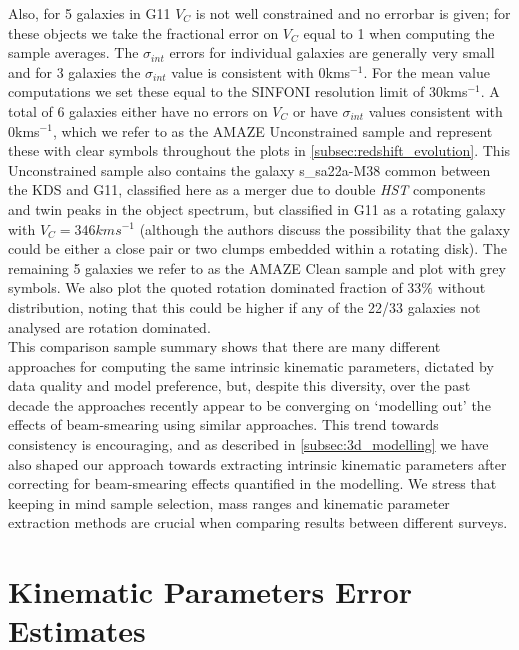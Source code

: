 \documentclass[fleqn,usenatbib]{mn2e}
\begin{document}
Also, for 5 galaxies in G11 $V_{C}$ is not well constrained and no errorbar is given; for these objects we take the fractional error on $V_{C}$ equal to 1 when computing the sample averages.
The $\sigma_{int}$ errors for individual galaxies are generally very small and for 3 galaxies the $\sigma_{int}$ value is consistent with 0kms$^{-1}$.
For the mean value computations we set these equal to the SINFONI resolution limit of 30kms$^{-1}$.
A total of 6 galaxies either have no errors on $V_{C}$ or have $\sigma_{int}$ values consistent with 0kms$^{-1}$, which we refer to as the AMAZE Unconstrained sample and represent these with clear symbols throughout the plots in \cref{subsec:redshift_evolution}.
This Unconstrained sample also contains the galaxy s\_sa22a-M38 common between the KDS and G11, classified here as a merger due to double {\em HST} components and twin peaks in the object spectrum, but classified in G11 as a rotating galaxy with $V_{C} = 346kms^{-1}$ (although the authors discuss the possibility that the galaxy could be either a close pair or two clumps embedded within a rotating disk).
The remaining 5 galaxies we refer to as the AMAZE Clean sample and plot with grey symbols.
We also plot the quoted rotation dominated fraction of 33$\%$ without distribution, noting that this could be higher if any of the 22/33 galaxies not analysed are rotation dominated. \\
 
This comparison sample summary shows that there are many different approaches for computing the same intrinsic kinematic parameters, dictated by data quality and model preference, but, despite this diversity, over the past decade the approaches recently appear to be converging on `modelling out' the effects of beam-smearing using similar approaches.
This trend towards consistency is encouraging, and as described in \cref{subsec:3d_modelling} we have also shaped our approach towards extracting intrinsic kinematic parameters after correcting for beam-smearing effects quantified in the modelling.
We stress that keeping in mind sample selection, mass ranges and kinematic parameter extraction methods are crucial when comparing results between different surveys.

\section{Kinematic Parameters Error Estimates}\label{app:kin_error_estimates}
\end{document}
